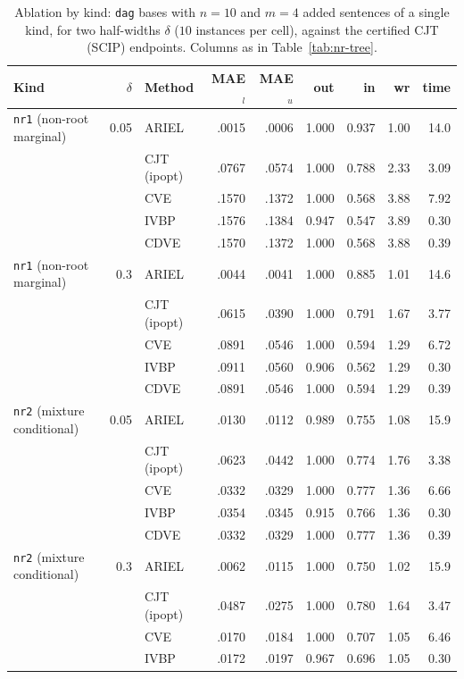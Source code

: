 \begin{table}[htbp]
\centering
\scriptsize
\caption{Ablation by kind: \texttt{dag} bases with $n=10$ and $m=4$ added sentences of a single kind, for two half-widths $\delta$ ($10$ instances per cell), against the certified CJT (SCIP) endpoints. Columns as in Table~\ref{tab:nr-tree}.}
\label{tab:nr-ablation}
\begin{tabular}{lrlrrrrrr}
\toprule
Kind & $\delta$ & Method & MAE$_l$ & MAE$_u$ & out & in & wr & time \\
\midrule
\texttt{nr1} (non-root marginal) & 0.05 & ARIEL & .0015 & .0006 & 1.000 & 0.937 & 1.00 & 14.0 \\
 &  & CJT (ipopt) & .0767 & .0574 & 1.000 & 0.788 & 2.33 & 3.09 \\
 &  & CVE & .1570 & .1372 & 1.000 & 0.568 & 3.88 & 7.92 \\
 &  & IVBP & .1576 & .1384 & 0.947 & 0.547 & 3.89 & 0.30 \\
 &  & CDVE & .1570 & .1372 & 1.000 & 0.568 & 3.88 & 0.39 \\
\midrule
\texttt{nr1} (non-root marginal) & 0.3 & ARIEL & .0044 & .0041 & 1.000 & 0.885 & 1.01 & 14.6 \\
 &  & CJT (ipopt) & .0615 & .0390 & 1.000 & 0.791 & 1.67 & 3.77 \\
 &  & CVE & .0891 & .0546 & 1.000 & 0.594 & 1.29 & 6.72 \\
 &  & IVBP & .0911 & .0560 & 0.906 & 0.562 & 1.29 & 0.30 \\
 &  & CDVE & .0891 & .0546 & 1.000 & 0.594 & 1.29 & 0.39 \\
\midrule
\texttt{nr2} (mixture conditional) & 0.05 & ARIEL & .0130 & .0112 & 0.989 & 0.755 & 1.08 & 15.9 \\
 &  & CJT (ipopt) & .0623 & .0442 & 1.000 & 0.774 & 1.76 & 3.38 \\
 &  & CVE & .0332 & .0329 & 1.000 & 0.777 & 1.36 & 6.66 \\
 &  & IVBP & .0354 & .0345 & 0.915 & 0.766 & 1.36 & 0.30 \\
 &  & CDVE & .0332 & .0329 & 1.000 & 0.777 & 1.36 & 0.39 \\
\midrule
\texttt{nr2} (mixture conditional) & 0.3 & ARIEL & .0062 & .0115 & 1.000 & 0.750 & 1.02 & 15.9 \\
 &  & CJT (ipopt) & .0487 & .0275 & 1.000 & 0.780 & 1.64 & 3.47 \\
 &  & CVE & .0170 & .0184 & 1.000 & 0.707 & 1.05 & 6.46 \\
 &  & IVBP & .0172 & .0197 & 0.967 & 0.696 & 1.05 & 0.30 \\

\end{tabular}
\end{table}
